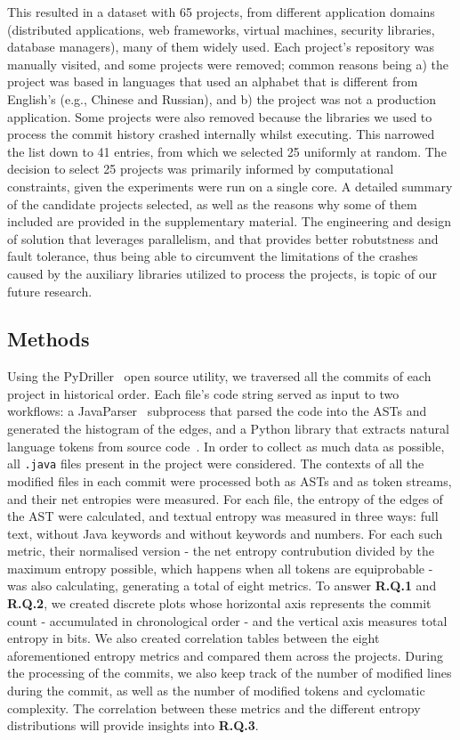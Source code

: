 \documentclass[10pt,conference]{IEEEtran}
\begin{document}
This resulted in a dataset with 65 projects, from different application domains (distributed applications, web frameworks, virtual machines, security libraries, database managers), many of them widely used. Each project's repository was manually visited, and some projects were removed; common reasons being a) the project was based in languages that used an alphabet that is different from English's (e.g., Chinese and Russian), and b) the project was not a production application. Some projects were also removed because the libraries we used to process the commit history crashed internally whilst executing. This narrowed the list down to 41 entries, from which we selected 25 uniformly at random. The decision to select 25 projects was primarily informed by computational constraints, given the experiments were run on a single core. A detailed summary of the candidate projects selected, as well as the reasons why some of them included are provided in the supplementary material. The engineering and design of solution that leverages parallelism, and that provides better robutstness and fault tolerance, thus being able to circumvent the limitations of the crashes caused by the auxiliary libraries utilized to process the projects, is topic of our future research.

\subsection{Methods}
Using the PyDriller~\cite{PyDriller} open source utility, we traversed all the commits of each project in historical order. Each file's code string served as input to two workflows: a JavaParser~\cite{javaparser} subprocess that parsed the code into the ASTs and generated the histogram of the edges, and a Python library that extracts natural language tokens from source code~\cite{Hucka2018spiral}. In order to collect as much data as possible, all \texttt{.java} files present in the project were considered. The contexts of all the modified files in each commit were processed both as ASTs and as token streams, and their net entropies were measured. For each file, the entropy of the edges of the AST were calculated, and textual entropy was measured in three ways: full text, without Java keywords and without keywords and numbers. For each such metric, their normalised version - the net entropy contrubution divided by the maximum entropy possible, which happens when all tokens are equiprobable - was also calculating, generating a total of eight metrics.
To answer \textbf{R.Q.1} and \textbf{R.Q.2}, we created discrete plots whose horizontal axis represents the commit count - accumulated in chronological order - and the vertical axis measures total entropy in bits. We also created correlation tables between the eight aforementioned entropy metrics and compared them across the projects.
During the processing of the commits, we also keep track of the number of modified lines during the commit, as well as the number of modified tokens and cyclomatic complexity. The correlation between these metrics and the different entropy distributions will provide insights into \textbf{R.Q.3}.
\end{document}
